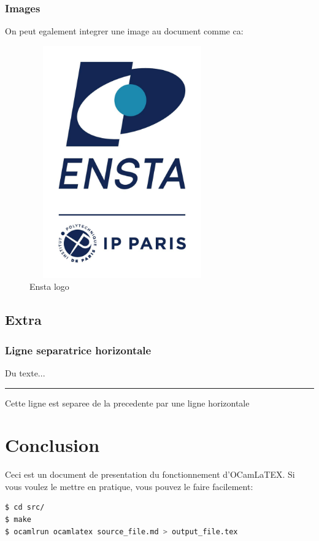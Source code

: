 \documentclass[11pt, a4paper]{article}
\begin{document}
\subsubsection{Images}

On peut egalement integrer une image au document comme ca: 
\begin{figure}[ht]
\centering
\includegraphics[width=8cm,height=10cm,keepaspectratio]{logo.jpg}
\caption{Ensta logo}
\end{figure}

\subsection{Extra}

\subsubsection{Ligne separatrice horizontale}

Du texte...

\noindent\rule{\textwidth}{1pt}

Cette ligne est separee de la precedente par une ligne horizontale 

\section{Conclusion}

Ceci est un document de presentation du fonctionnement d'OCamLaTEX. Si vous voulez le mettre en pratique, vous pouvez le faire facilement:

\begin{lstlisting}[language=bash]
$ cd src/
$ make
$ ocamlrun ocamlatex source_file.md > output_file.tex
\end{lstlisting}
\end{document}
